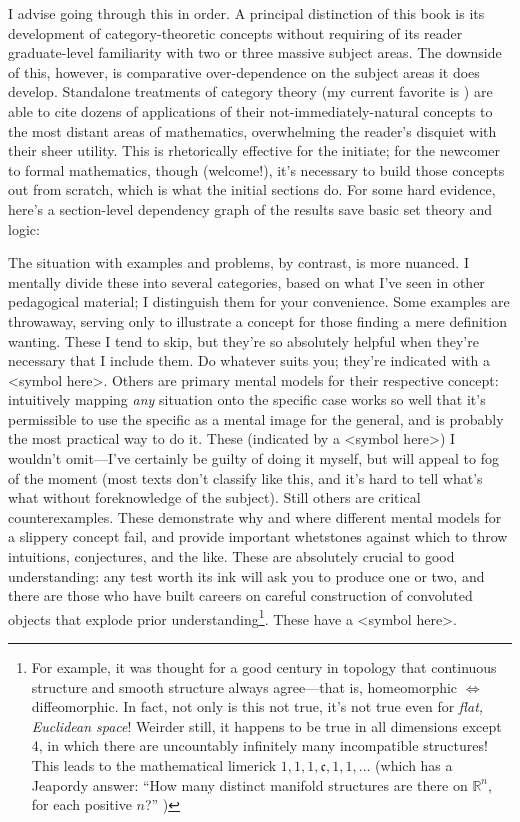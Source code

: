 I advise going through this in order.
A principal distinction of this book is its development of category-theoretic concepts without requiring of its reader
graduate-level familiarity with two or three massive subject areas.
The downside of this, however, is comparative over-dependence on the subject areas it does develop.
Standalone treatments of category theory (my current favorite is \cite{Reihl}) are able to cite dozens of applications
of their not-immediately-natural concepts to the most distant areas of mathematics, overwhelming the reader's disquiet with their sheer utility.
This is rhetorically effective for the initiate; for the newcomer to formal mathematics, though (welcome!),
it's necessary to build those concepts out from scratch, which is what the initial sections do.
For some hard evidence, here's a section-level dependency graph of the results save basic set theory and logic: %

The situation with examples and problems, by contrast, is more nuanced.
I mentally divide these into several categories, based on what I've seen in other pedagogical material; I distinguish them for your convenience.
Some examples are throwaway, serving only to illustrate a concept for those finding a mere definition wanting.
These I tend to skip, but they're so absolutely helpful when they're necessary that I include them.
Do whatever suits you; they're indicated with a <symbol here>. %
Others are primary mental models for their respective concept: intuitively mapping \textit{any} situation onto the specific case
works so well that it's permissible to use the specific as a mental image for the general, and is probably the most practical way to do it.
These (indicated by a <symbol here>) I wouldn't omit---I've certainly be guilty of doing it myself, but will appeal to fog of the moment %
(most texts don't classify like this, and it's hard to tell what's what without foreknowledge of the subject).
Still others are critical counterexamples.
These demonstrate why and where different mental models for a slippery concept fail, and provide important whetstones against which to throw
intuitions, conjectures, and the like.
These are absolutely crucial to good understanding: any test worth its ink will ask you to produce one or two,
and there are those who have built careers on careful construction of convoluted objects that explode prior understanding\footnote
{
  For example, it was thought for a good century in topology that continuous structure and smooth structure always agree---that is,
  homeomorphic $\Leftrightarrow$ diffeomorphic. In fact, not only is this not true, it's not true even for \textit{flat, Euclidean space}!
  Weirder still, it happens to be true in all dimensions except 4, in which there are uncountably infinitely many incompatible structures!
  This leads to the mathematical limerick $1, 1, 1, \mathfrak{c}, 1, 1, \ldots$
  (which has a Jeapordy answer: ``How many distinct manifold structures are there on $\mathbb{R}^{n}$, for each positive $n$?'' )
}.
These have a <symbol here>. %

